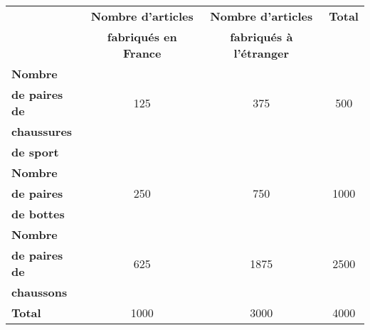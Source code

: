 \begin{tabular}{|@{\ }l@{\ }|@{\ }c@{\ }|@{\ }c@{\ }|c|}
	\hline
	& \textbf{Nombre d'articles}     & \textbf{Nombre d'articles}       &    \textbf{Total}      \\
	& \textbf{fabriqués en France}  & \textbf{fabriqués à l'étranger}    &                \\ \hline
	\textbf{Nombre}       &                     &                       &                \\
	\textbf{de paires de} &       \num{125}     &   \num{375}           &  \num{500}     \\
	\textbf{chaussures}   &                     &                       &                \\
	\textbf{de sport}     &                     &                       &                \\ \hline
	\textbf{Nombre}       &                     &                       &                \\
	\textbf{de paires}    &       \num{250}     &   \num{750}           &  \num{1000}    \\
	\textbf{de bottes}    &                     &                       &                \\ \hline 
	\textbf{Nombre}       &                     &                       &                \\
	\textbf{de paires de} &       \num{625}     &   \num{1875}          &  \num{2500}    \\
	\textbf{chaussons}    &                     &                       &                \\ \hline
	\textbf{Total}        &       \num{1000}    &   \num{3000}          &  \num{4000} 	\\ \hline
\end{tabular}